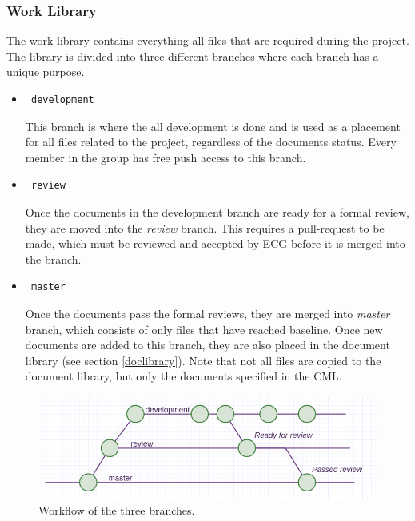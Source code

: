 \documentclass{article}
\begin{document}
            
        \subsubsection{Work Library}
            The work library contains everything all files that are required during the project.
            The library is divided into three different branches where each branch has a unique purpose.
            
            \begin{itemize}
                \item \begin{verbatim} development \end{verbatim}
                This branch is where the all development is done and is used as a placement for all files related
                to the project, regardless of the documents status.
                Every member in the group has free push access to this branch.
                
                \item \begin{verbatim} review \end{verbatim}
                Once the documents in the development branch are ready for a formal review,  they are moved
                into the \textit{review} branch. This requires a pull-request to be made, which must be reviewed and accepted by ECG before it is merged into the branch. 
                
                \item \begin{verbatim} master \end{verbatim}
                Once the documents pass the formal reviews, they are merged into 
                \textit{master} branch, which consists of only files that have reached baseline.
                Once new documents are added to this branch, they are also placed in the document library (see section \ref{doclibrary}).
                Note that not all files are copied to the document library, but only the documents specified in the CML.
                
            \end{itemize}
            
            \begin{figure}[h]
                \centering
                \includegraphics[width=\textwidth]{images/workflow.png}
                \caption{Workflow of the three branches.}
                \label{workflow}
            \end{figure}
        
\end{document}
